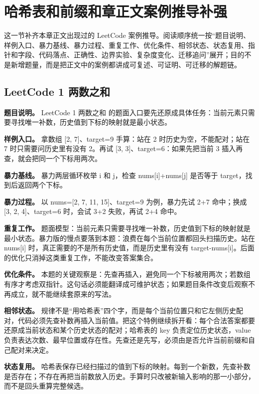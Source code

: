 \section{哈希表和前缀和章正文案例推导补强}

这一节补齐本章正文出现过的 LeetCode 案例推导。阅读顺序统一按“题目说明、样例入口、暴力基线、暴力过程、重复工作、优化条件、相邻状态、状态复用、指针和字段、代码落点、正确性、边界实验、复杂度变化、迁移追问”展开；目的不是新增题量，而是把正文中的案例都讲成可复述、可证明、可迁移的解题链。

\subsection{LeetCode 1 两数之和}

\textbf{题目说明。} LeetCode 1 两数之和 的题面入口要先还原成具体任务：当前元素只需要寻找唯一补数，历史值到下标的映射就是最小状态。

\textbf{样例入口。} 拿数组 [2, 7]、target=9 手算：站在 2 时历史为空，不能配对；站在 7 时只需要问历史里有没有 2。再试 [3, 3]、target=6：如果先把当前 3 插入再查，就会把同一个下标用两次。

\textbf{暴力基线。} 暴力两层循环枚举 i 和 j，检查 nums[i]+nums[j] 是否等于 target，找到后返回两个下标。

\textbf{暴力过程。} 以 nums=[2, 7, 11, 15]、target=9 为例，暴力先试 2+7 命中；换成 [3, 2, 4]、target=6 时，会试 3+2 失败，再试 2+4 命中。

\textbf{重复工作。} 题面模型：当前元素只需要寻找唯一补数，历史值到下标的映射就是最小状态。暴力版的慢点要落到本题：浪费在每个当前位置都回头扫描历史。站在 nums[i] 时，真正需要的不是所有历史值，而是历史里有没有 target-nums[i]。后面的优化只消掉这类重复工作，不能改变答案集合。

\textbf{优化条件。} 本题的关键观察是：先查再插入，避免同一个下标被用两次；若数组有序才考虑双指针。这句话必须能翻译成可维护状态；如果题目条件改变后观察不再成立，就不能继续套原来的写法。

\textbf{相邻状态。} 规律不是“用哈希表”四个字，而是每个当前位置只和它左侧历史配对，代码必须先查补数再插入当前值。把这个特例继续拆开看：每个合法答案都要还原成当前状态和某个历史状态的配对；哈希表的 key 负责定位历史状态，value 负责表达次数、最早位置或存在性。先查还是先写，必须由是否允许当前前缀和自己配对来决定。

\textbf{状态复用。} 哈希表保存已经扫描过的值到下标的映射。每到一个新数，先查补数是否存在；不存在再把当前数放入历史。手算时只改被新输入影响的那一小部分，而不是回头重算完整候选。

